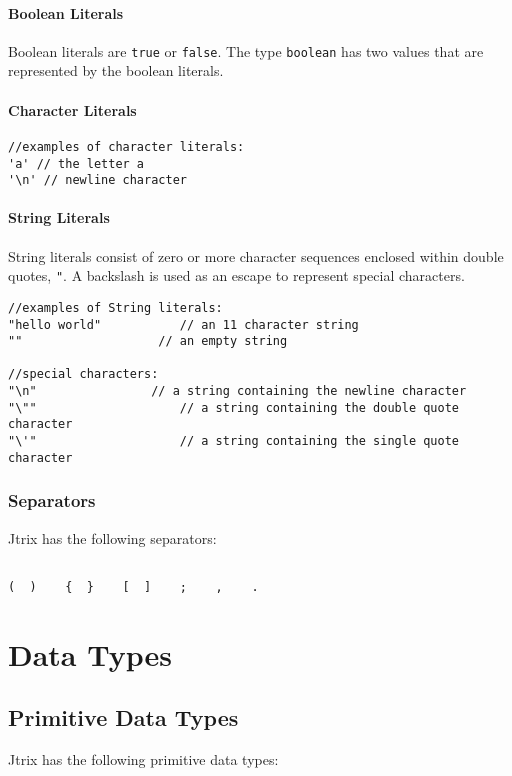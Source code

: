 \documentclass[titlepage, 12pt]{report}
\begin{document}
\subsubsection{Boolean Literals}
Boolean literals are \texttt{true} or \texttt{false}. The type \texttt{boolean} has two values that are represented by the boolean literals.

\subsubsection{Character Literals}
\begin{lstlisting}
//examples of character literals:
'a' // the letter a
'\n' // newline character
\end{lstlisting}
\subsubsection{String Literals}
String literals consist of zero or more character sequences enclosed within double quotes, \texttt{"}.  A backslash is used as an escape to represent special characters.
\begin{lstlisting}
//examples of String literals:
"hello world"			// an 11 character string
""                   // an empty string

//special characters:
"\n"  				// a string containing the newline character
"\""					// a string containing the double quote character
"\'"					// a string containing the single quote character
\end{lstlisting}
\subsection{Separators}
Jtrix has the following separators:

\begin{lstlisting}

(  )    {  }    [  ]    ;    ,    .
\end{lstlisting}

\chapter{Data Types}

\section{Primitive Data Types}
Jtrix has the following primitive data types:
\end{document}
